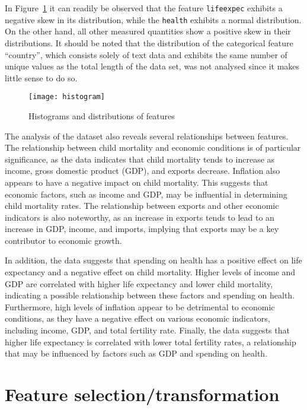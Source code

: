 \documentclass[
  course = {{DS12E Clustering Algorithms}},
  quartile = {{2}},
  assignment = 2,
  name = {{Michael Darmanis ; Vasilios Venieris}},
  studentnumber = {{7115152200004 ; 7115152200017}},
  email = {{mdarm@di.uoa.gr ; vvenieris@di.uoa.gr}},
  firstexercise = 1
]{aga-homework}
\begin{document}
In Figure~\ref{fig:hist} it can readily be observed that the feature \texttt{life\textunderscore expec} exhibits a negative skew in its distribution, while the \texttt{health} exhibits a normal distribution. On the other hand, all other measured quantities show a positive skew in their distributions. It should be noted that the distribution of the categorical feature ``country'', which consists solely of text data and exhibits the same number of unique values as the total length of the data set, was not analysed since it makes little sense to do so.

\begin{figure}[htbp]
	\centering
	\texttt{[image: histogram]}
	\caption{Histograms and distributions of features}
	\label{fig:hist}
\end{figure}

The analysis of the dataset also reveals several relationships between features. The relationship between child mortality and economic conditions is of particular significance, as the data indicates that child mortality tends to increase as income, gross domestic product (GDP), and exports decrease. Inflation also appears to have a negative impact on child mortality. This suggests that economic factors, such as income and GDP, may be influential in determining child mortality rates. The relationship between exports and other economic indicators is also noteworthy, as an increase in exports tends to lead to an increase in GDP, income, and imports, implying that exports may be a key contributor to economic growth.

In addition, the data suggests that spending on health has a positive effect on life expectancy and a negative effect on child mortality. Higher levels of income and GDP are correlated with higher life expectancy and lower child mortality, indicating a possible relationship between these factors and spending on health. Furthermore, high levels of inflation appear to be detrimental to economic conditions, as they have a negative effect on various economic indicators, including income, GDP, and total fertility rate. Finally, the data suggests that higher life expectancy is correlated with lower total fertility rates, a relationship that may be influenced by factors such as GDP and spending on health.

\section{Feature selection/transformation}\label{sec:feature}
\end{document}
